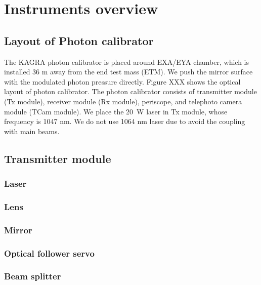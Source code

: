 
\chapter{Instruments overview} %

\label{Chapter3} %




\section{Layout  of Photon calibrator}
The KAGRA photon calibrator is placed around EXA/EYA chamber, which is installed 36 m away from the end test mass (ETM). We push the mirror surface with the modulated photon pressure directly. Figure XXX shows the optical layout of photon calibrator. The photon calibrator consists of transmitter module (Tx module), receiver module (Rx module), periscope, and telephoto camera module (TCam module). We place the 20~W laser in Tx module, whose frequency is 1047 nm. We do not use 1064 nm laser due to avoid the coupling with main beams.   

\section{Transmitter module}

\subsection{Laser}
\subsection{Lens}
\subsection{Mirror}
\subsection{Optical follower servo}
\subsection{Beam splitter}
